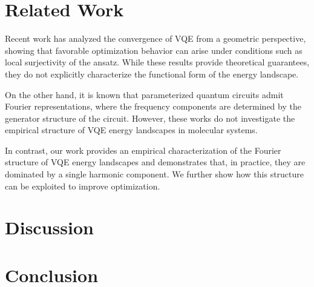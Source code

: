 \documentclass[12pt]{article}
\begin{document}

\section{Related Work}

Recent work has analyzed the convergence of VQE from a geometric perspective, showing that favorable optimization behavior can arise under conditions such as local surjectivity of the ansatz. While these results provide theoretical guarantees, they do not explicitly characterize the functional form of the energy landscape.

On the other hand, it is known that parameterized quantum circuits admit Fourier representations, where the frequency components are determined by the generator structure of the circuit. However, these works do not investigate the empirical structure of VQE energy landscapes in molecular systems.

In contrast, our work provides an empirical characterization of the Fourier structure of VQE energy landscapes and demonstrates that, in practice, they are dominated by a single harmonic component. We further show how this structure can be exploited to improve optimization.

\section{Discussion}



\section{Conclusion}







\end{document}
